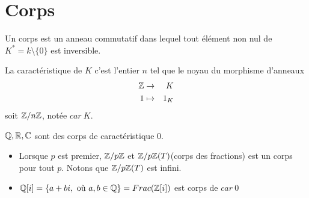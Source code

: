 \section{Corps}


\begin{definition}
	Un corps est un anneau commutatif dans lequel tout élément non nul de $K^* = k \setminus \{0\}$ est inversible.
\end{definition}

\begin{definition}
	La caractéristique de $K$ c'est l'entier $n$ tel que le noyau du morphisme d'anneaux
	\begin{eqnarray*}
		\mathbb{Z} &\to& K \\
		1 &\mapsto& 1_K
	\end{eqnarray*}
	soit $\mathbb{Z}/n\mathbb{Z}$, notée $car \ K$.
\end{definition}

\begin{example}
	$\mathbb{Q}, \mathbb{R}, \mathbb{C}$ sont des corps de caractéristique 0.
	\begin{itemize}
		\item Lorsque $p$ est premier, $\mathbb{Z}/p\mathbb{Z}$ et $\mathbb{Z}/p\mathbb{Z}(T)$(corps des fractions) est un corps pour tout $p$. Notons que $\mathbb{Z}/p\mathbb{Z}(T)$ est infini.
		\item $\mathbb{Q}[i] = \left\{ a + bi, \text{ où } a,b \in \mathbb{Q}\right\} = Frac (\mathbb{Z}[i])$ est corps de $car\ 0$
	\end{itemize}
\end{example}


